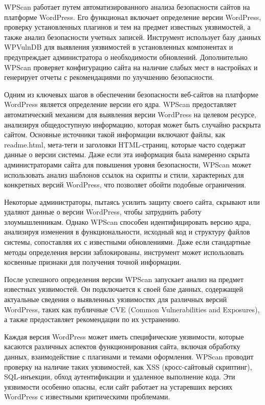 \documentclass[
]{article}
\begin{document}
WPScan работает путем автоматизированного анализа безопасности сайтов на
платформе WordPress. Его функционал включает определение версии
WordPress, проверку установленных плагинов и тем на предмет известных
уязвимостей, а также анализ безопасности учетных записей. Инструмент
использует базу данных WPVulnDB для выявления уязвимостей в
установленных компонентах и предупреждает администратора о необходимости
обновлений. Дополнительно WPScan проверяет конфигурацию сайта на наличие
слабых мест в настройках и генерирует отчеты с рекомендациями по
улучшению безопасности.

Одним из ключевых шагов в обеспечении безопасности веб-сайтов на
платформе WordPress является определение версии его ядра. WPScan
предоставляет автоматический механизм для выявления версии WordPress на
целевом ресурсе, анализируя общедоступную информацию, которая может быть
случайно раскрыта сайтом. Основные источники такой информации включают
файлы, как readme.html, мета-теги и заголовки HTML-страниц, которые
часто содержат данные о версии системы. Даже если эта информация была
намеренно скрыта администраторами сайта для повышения уровня
безопасности, WPScan может использовать анализ шаблонов ссылок на
скрипты и стили, характерных для конкретных версий WordPress, что
позволяет обойти подобные ограничения.

Некоторые администраторы, пытаясь усилить защиту своего сайта, скрывают
или удаляют данные о версии WordPress, чтобы затруднить работу
злоумышленникам. Однако WPScan способен идентифицировать версию ядра,
анализируя изменения в функциональности, исходный код и структуру файлов
системы, сопоставляя их с известными обновлениями. Даже если стандартные
методы определения версии заблокированы, инструмент может использовать
косвенные признаки для получения точной информации.

После успешного определения версии WPScan запускает анализ на предмет
известных уязвимостей. Он подключается к своей базе данных, содержащей
актуальные сведения о выявленных уязвимостях для различных версий
WordPress, таких как публичные CVE (Common Vulnerabilities and
Exposures), а также предоставляет рекомендации по их устранению.

Каждая версия WordPress может иметь специфические уязвимости, которые
касаются различных аспектов функционирования сайта, включая обработку
данных, взаимодействие с плагинами и темами оформления. WPScan проводит
проверку на наличие таких уязвимостей, как XSS (кросс-сайтовый
скриптинг), SQL-инъекции, обход аутентификации и удаленное выполнение
кода. Эти уязвимости особенно опасны, если сайт работает на устаревших
версиях WordPress с известными критическими проблемами.
\end{document}
